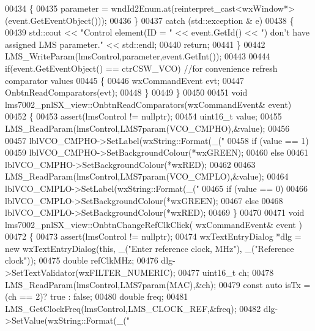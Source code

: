 \begin{DoxyCode}
{{{{{{{{{{{{{{{{{{{{{{{{{{{{{{{{{{{{{{{{{{{{{{{{{{{{{{{{{{{{{{{{{{{{{{{{{{{{{{{{{{{{{{{{{{{{{{{{{{{{{{{{{{{{{{{{{{{{{{{{{{{{{{{{{{{{{{{{{{{{{{{{{{{{{{{{{{{{{{{{{{{{{{{{{{{{{{{{{{{{{{{{{{{{{{{{{{{{{{{{{{{{{{{{{{{{{{{{{{{{{{{{{{{{{{{{{{{{{{{{{{{{{{{{{{{{{{{{{{{{{{00434     \{
00435         parameter = wndId2Enum.at(reinterpret\_cast<wxWindow*>(event.GetEventObject()));
00436     \}
00437     \textcolor{keywordflow}{catch} (std::exception & e)
00438     \{
00439         std::cout << \textcolor{stringliteral}{"Control element(ID = "} << \textcolor{keyword}{event}.GetId() << \textcolor{stringliteral}{") don't have assigned LMS parameter."} << 
      std::endl;
00440         \textcolor{keywordflow}{return};
00441     \}
00442     LMS_WriteParam(lmsControl,parameter,event.GetInt());
00443 
00444     \textcolor{keywordflow}{if}(event.GetEventObject() == ctrCSW_VCO) \textcolor{comment}{//for convenience refresh comparator values}
00445     \{
00446         wxCommandEvent evt;
00447         OnbtnReadComparators(evt);
00448     \}
00449 \}
00450 
00451 \textcolor{keywordtype}{void} lms7002_pnlSX_view::OnbtnReadComparators(wxCommandEvent& event)
00452 \{
00453     assert(lmsControl != \textcolor{keyword}{nullptr});
00454     uint16\_t value;
00455     LMS_ReadParam(lmsControl,LMS7param(VCO_CMPHO),&value);
00456 
00457     lblVCO_CMPHO->SetLabel(wxString::Format(\_(\textcolor{stringliteral}{"%
00458     \textcolor{keywordflow}{if} (value == 1)
00459         lblVCO_CMPHO->SetBackgroundColour(*wxGREEN);
00460     \textcolor{keywordflow}{else}
00461         lblVCO_CMPHO->SetBackgroundColour(*wxRED);
00462 
00463     LMS_ReadParam(lmsControl,LMS7param(VCO_CMPLO),&value);
00464     lblVCO_CMPLO->SetLabel(wxString::Format(\_(\textcolor{stringliteral}{"%
00465     \textcolor{keywordflow}{if} (value == 0)
00466         lblVCO_CMPLO->SetBackgroundColour(*wxGREEN);
00467     \textcolor{keywordflow}{else}
00468         lblVCO_CMPLO->SetBackgroundColour(*wxRED);
00469 \}
00470 
00471 \textcolor{keywordtype}{void} lms7002_pnlSX_view::OnbtnChangeRefClkClick( wxCommandEvent& event )
00472 \{
00473     assert(lmsControl != \textcolor{keyword}{nullptr});
00474     wxTextEntryDialog *dlg = \textcolor{keyword}{new} wxTextEntryDialog(\textcolor{keyword}{this}, \_(\textcolor{stringliteral}{"Enter reference clock, MHz"}), \_(\textcolor{stringliteral}{"Reference
       clock"}));
00475     \textcolor{keywordtype}{double} refClkMHz;
00476     dlg->SetTextValidator(wxFILTER\_NUMERIC);
00477     uint16\_t ch;
00478     LMS_ReadParam(lmsControl,LMS7param(MAC),&ch);
00479     \textcolor{keyword}{const} \textcolor{keyword}{auto} isTx = (ch == 2)? \textcolor{keyword}{true} : \textcolor{keyword}{false};
00480     \textcolor{keywordtype}{double} freq;
00481     LMS_GetClockFreq(lmsControl,LMS_CLOCK_REF,&freq);
00482     dlg->SetValue(wxString::Format(\_(\textcolor{stringliteral}{"%
}}}}}}}}}}}}}}}}}}}}}}}}}}}}}}}}}}}}}}}}}}}}}}}}}}}}}}}}}}}}}}}}}}}}}}}}}}}}}}}}}}}}}}}}}}}}}}}}}}}}}}}}}}}}}}}}}}}}}}}}}}}}}}}}}}}}}}}}}}}}}}}}}}}}}}}}}}}}}}}}}}}}}}}}}}}}}}}}}}}}}}}}}}}}}}}}}}}}}}}}}}}}}}}}}}}}}}}}}}}}}}}}}}}}}}}}}}}}}}}}}}}}}}}}}}}}}}}}}}}}}}}}}
\end{DoxyCode}

